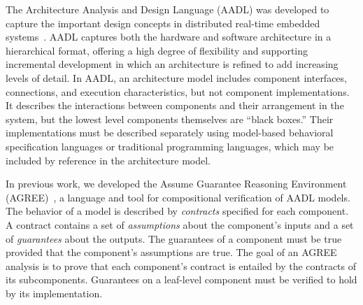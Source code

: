 The Architecture Analysis and Design Language (AADL) was developed to capture the important 
design concepts in distributed real-time embedded systems~\cite{FeilerModelBasedEngineering2012}. 
AADL captures both the hardware and software architecture in a hierarchical format,  
offering a high degree of flexibility and supporting incremental development 
in which an architecture is refined to add increasing levels of detail.
%
In AADL, an architecture model includes component interfaces, connections, and execution characteristics, but not component implementations. It describes the interactions between components and their arrangement in the system, but the lowest level 
components themselves are ``black boxes.'' Their implementations must be described separately using model-based behavioral specification languages or traditional programming languages, which may be included by reference in the architecture model.  

In previous work, we developed the Assume Guarantee Reasoning Environment (AGREE)~\cite{8625938}, a language and tool for compositional verification of AADL models.  The behavior of a model is described by {\em contracts} specified for each component.  A contract contains a set of {\em assumptions} about the component's inputs and a set of {\em guarantees} about the outputs.  The guarantees of a component must be true provided that the component's assumptions are true.  The goal of an AGREE analysis is to prove that each component's contract is entailed by the contracts of its subcomponents.  Guarantees on a leaf-level component must be verified to hold by its implementation.  

